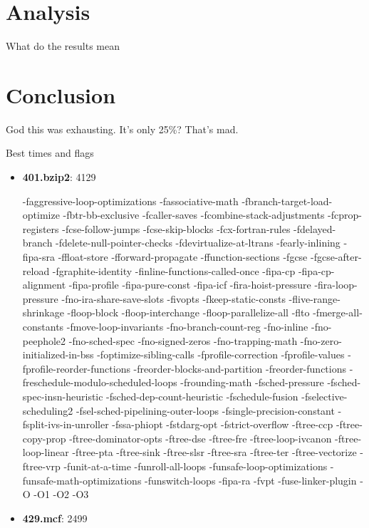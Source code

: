 \documentclass[conference]{IEEEtran}
\begin{document}
\section{Analysis}
What do the results mean

\section{Conclusion}
God this was exhausting. It's only 25\%? That's mad.

Best times and flags
\begin{itemize}[]
  \item \textbf{401.bzip2}: 4129

  -faggressive-loop-optimizations -fassociative-math -fbranch-target-load-optimize -fbtr-bb-exclusive -fcaller-saves -fcombine-stack-adjustments -fcprop-registers -fcse-follow-jumps -fcse-skip-blocks -fcx-fortran-rules -fdelayed-branch -fdelete-null-pointer-checks -fdevirtualize-at-ltrans -fearly-inlining -fipa-sra -ffloat-store -fforward-propagate -ffunction-sections -fgcse -fgcse-after-reload -fgraphite-identity -finline-functions-called-once -fipa-cp -fipa-cp-alignment -fipa-profile -fipa-pure-const -fipa-icf -fira-hoist-pressure -fira-loop-pressure -fno-ira-share-save-slots -fivopts -fkeep-static-consts -flive-range-shrinkage -floop-block -floop-interchange -floop-parallelize-all -flto -fmerge-all-constants -fmove-loop-invariants -fno-branch-count-reg -fno-inline -fno-peephole2 -fno-sched-spec -fno-signed-zeros -fno-trapping-math -fno-zero-initialized-in-bss -foptimize-sibling-calls -fprofile-correction -fprofile-values -fprofile-reorder-functions -freorder-blocks-and-partition -freorder-functions -freschedule-modulo-scheduled-loops -frounding-math -fsched-pressure -fsched-spec-insn-heuristic -fsched-dep-count-heuristic -fschedule-fusion -fselective-scheduling2 -fsel-sched-pipelining-outer-loops -fsingle-precision-constant -fsplit-ivs-in-unroller -fssa-phiopt -fstdarg-opt -fstrict-overflow -ftree-ccp -ftree-copy-prop -ftree-dominator-opts -ftree-dse -ftree-fre -ftree-loop-ivcanon -ftree-loop-linear -ftree-pta -ftree-sink -ftree-slsr -ftree-sra -ftree-ter -ftree-vectorize -ftree-vrp -funit-at-a-time -funroll-all-loops -funsafe-loop-optimizations -funsafe-math-optimizations -funswitch-loops -fipa-ra -fvpt -fuse-linker-plugin -O -O1 -O2 -O3
  \item \textbf{429.mcf}: 2499

\end{itemize}
\end{document}
